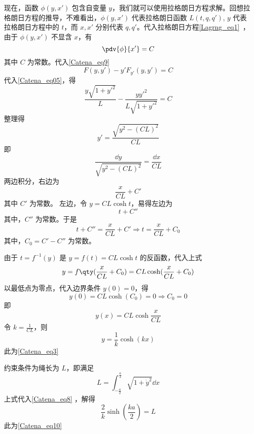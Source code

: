 现在，函数 $\phi(y,x')$ 包含自变量 $y$，我们就可以使用拉格朗日方程求解。回想拉格朗日方程的推导，不难看出，$\phi(y,x')$ 代表拉格朗日函数 $L(t,q,q')$, $y$ 代表拉格朗日方程中的 $t$，而 $x,x'$ 分别代表 $q,q'$。代入拉格朗日方程\autoref{Lagrng_eq1}~，由于 $\phi(y,x')$ 不显含 $x$，有
\begin{equation}
\pdv{\phi}{x'}=C
\end{equation}
其中 $C$ 为常数。代入\autoref{Catena_eq9} 
\begin{equation}
F(y,y')-y'F_{y'}(y,y')=C
\end{equation}
代入\autoref{Catena_eq05}，得
\begin{equation}
\frac{y\sqrt{1+y'^2}}{L}-\frac{yy'^2}{L\sqrt{1+y'^2}}=C
\end{equation}
整理得
\begin{equation}
y'=\frac{\sqrt{y^2-(CL)^2}}{CL}
\end{equation}
即
\begin{equation}
\frac{\dd y}{\sqrt{y^2-(CL)^2}}=\frac{\dd x}{CL}
\end{equation}
两边积分，右边为
\begin{equation}
\frac{x}{CL}+C'
\end{equation}
其中 $C'$ 为常数。
左边，令 $y=CL\cosh t $，易得左边为
\begin{equation}
t+C''
\end{equation}
其中，$C''$ 为常数。于是
\begin{equation}
t+C''=\frac{x}{CL}+C'\Rightarrow t=\frac{x}{CL}+C_0
\end{equation}
其中，$C_0=C'-C''$ 为常数。

由于 $t=f^{-1}(y)$ 是 $y=f(t)=CL\cosh t$ 的反函数，代入上式
\begin{equation}\label{Catena_eq13}
y=f\qty(\frac{x}{CL}+C_0)=CL\cosh (\frac{x}{CL}+C_0)
\end{equation}
以最低点为零点，代入边界条件 $y(0)=0$，得
\begin{equation}
y(0)=CL\cosh (C_0)=0\Rightarrow C_0=0
\end{equation}
即
\begin{equation}
y(x)=CL \cosh \frac{x}{CL}
\end{equation}
令 $k=\frac{1}{CL}$，则
\begin{equation}\label{Catena_eq8}
y=\frac{1}{k}\cosh (kx)
\end{equation}
此为\autoref{Catena_eq3} 

约束条件为绳长为 $L$，即满足
\begin{equation}
L = \int_{-\frac{a}{2}}^{\frac{a}{2}} \sqrt{1 + \dot y^2} \dd{x}
\end{equation}
上式代入\autoref{Catena_eq8} ，解得
\begin{equation}
\frac{2}{k}\sinh(\frac{ka}{2}) = L
\end{equation}
此为\autoref{Catena_eq10} 

